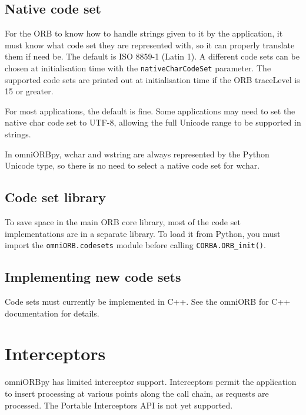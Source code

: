 \documentclass[draft,11pt,twoside,a4paper]{book}
\newcommand{\code}[1]{\texttt{#1}}
\newcommand{\op}[1]{\texttt{#1()}}
\newcommand{\dsc}{\discretionary{}{}{}}
\begin{document}
\section{Native code set}

For the ORB to know how to handle strings given to it by the
application, it must know what code set they are represented with, so
it can properly translate them if need be. The default is ISO 8859-1
(Latin 1). A different code sets can be chosen at initialisation time
with the \code{nativeCharCodeSet} parameter. The supported code sets
are printed out at initialisation time if the ORB traceLevel is 15 or
greater.

For most applications, the default is fine. Some applications may need
to set the native char code set to UTF-8, allowing the full Unicode
range to be supported in strings.

In omniORBpy, wchar and wstring are always represented by the Python
Unicode type, so there is no need to select a native code set for
wchar.


\section{Code set library}

To save space in the main ORB core library, most of the code set
implementations are in a separate library. To load it from Python, you
must import the \code{omniORB.\dsc{}codesets} module before calling
\op{CORBA.ORB\_init}.


\section{Implementing new code sets}

Code sets must currently be implemented in C++. See the omniORB for
C++ documentation for details.



\chapter{Interceptors}
\label{chap:interceptors}

omniORBpy has limited interceptor support. Interceptors permit the
application to insert processing at various points along the call
chain, as requests are processed. The Portable Interceptors API is not
yet supported.
\end{document}
